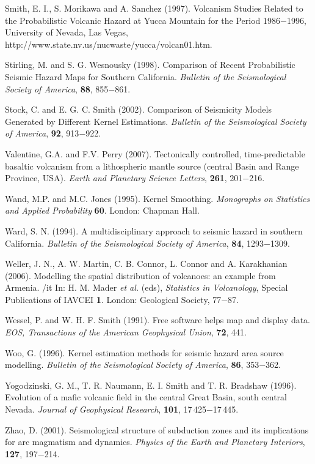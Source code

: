 \documentclass[10pt]{article}
\begin{document}
\begin{thebibliography}{99}
{
Smith, E. I., S. Morikawa and A. Sanchez (1997). Volcanism Studies Related to the Probabilistic Volcanic Hazard at Yucca Mountain for the Period 1986$-$1996, University of Nevada, Las Vegas, http://www.state.nv.us/nucwaste/yucca/volcan01.htm.

Stirling, M. and S. G. Wesnousky (1998). Comparison of Recent Probabilistic Seismic Hazard Maps for Southern California. {\it Bulletin of the Seismological Society of America}, {\bf 88}, 855$-$861.

Stock, C. and E. G. C. Smith (2002). Comparison of Seismicity Models Generated by Different Kernel Estimations. {\it Bulletin of the Seismological Society of America}, {\bf 92}, 913$-$922.

Valentine, G.A. and F.V. Perry (2007). Tectonically controlled, time-predictable basaltic volcanism from a lithospheric mantle source (central Basin and Range Province, USA). {\it Earth and Planetary Science Letters}, {\bf 261}, 201$-$216.

Wand, M.P. and M.C. Jones (1995). Kernel Smoothing. {\it Monographs on Statistics and Applied Probability} {\bf 60}. London: Chapman Hall.

Ward, S. N. (1994). A multidisciplinary approach to seismic hazard in southern California. {\it Bulletin of the Seismological Society of America}, {\bf 84}, 1293$-$1309.

Weller, J. N., A. W. Martin, C. B. Connor, L. Connor and A. Karakhanian (2006). Modelling the spatial distribution of volcanoes: an example from Armenia. {/it In:} H. M. Mader {\it et al.} (eds), {\it Statistics in Volcanology}, Special Publications of IAVCEI {\bf 1}. London: Geological Society, 77$-$87.

Wessel, P. and W. H. F. Smith (1991). Free software helps map and display data. {\it EOS, Transactions of the American Geophysical Union}, {\bf 72}, 441.

Woo, G. (1996). Kernel estimation methods for seismic hazard area source modelling. {\it Bulletin of the Seismological Society of America},  {\bf 86}, 353$-$362.

Yogodzinski, G. M., T. R. Naumann, E. I. Smith and T. R. Bradshaw (1996). Evolution of a mafic volcanic field in the central Great Basin,
south central Nevada. {\it Journal of Geophysical Research}, {\bf 101}, 17\,425$-$17\,445.

Zhao, D. (2001). Seismological structure of subduction zones and its implications for arc magmatism and dynamics. {\it Physics of the Earth and Planetary Interiors}, {\bf 127}, 197$-$214.

}
\end{thebibliography}
\end{document}

